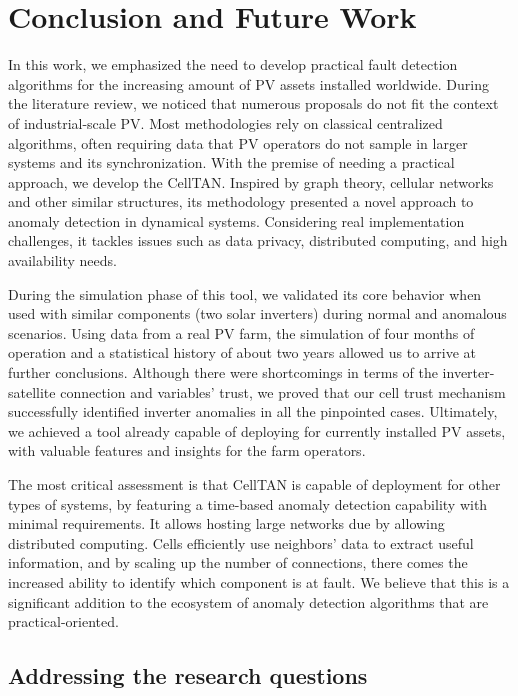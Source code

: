 \chapter{Conclusion and Future Work} \label{chap:concl}

In this work, we emphasized the need to develop practical fault detection algorithms for the increasing amount of PV assets installed worldwide. During the literature review, we noticed that numerous proposals do not fit the context of industrial-scale PV. Most methodologies rely on classical centralized algorithms, often requiring data that PV operators do not sample in larger systems and its synchronization.
With the premise of needing a practical approach, we develop the CellTAN. Inspired by graph theory, cellular networks and other similar structures, its methodology presented a novel approach to anomaly detection in dynamical systems. Considering real implementation challenges, it tackles issues such as data privacy, distributed computing, and high availability needs.

During the simulation phase of this tool, we validated its core behavior when used with similar components (two solar inverters) during normal and anomalous scenarios. Using data from a real PV farm, the simulation of four months of operation and a statistical history of about two years allowed us to arrive at further conclusions. Although there were shortcomings in terms of the inverter-satellite connection and variables' trust, we proved that our cell trust mechanism successfully identified inverter anomalies in all the pinpointed cases. Ultimately, we achieved a tool already capable of deploying for currently installed PV assets, with valuable features and insights for the farm operators.

The most critical assessment is that CellTAN is capable of deployment for other types of systems, by featuring a time-based anomaly detection capability with minimal requirements. It allows hosting large networks due by allowing distributed computing. Cells efficiently use neighbors' data to extract useful information, and by scaling up the number of connections, there comes the increased ability to identify which component is at fault.
We believe that this is a significant addition to the ecosystem of anomaly detection algorithms that are practical-oriented.

\section{Addressing the research questions}


